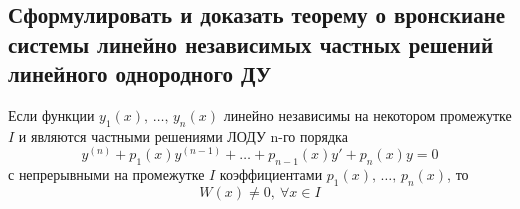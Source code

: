 \subsection{Сформулировать и доказать теорему о вронскиане системы линейно независимых частных решений линейного однородного ДУ}

\begin{theorem*}
    Если функции $y_1(x),\, \ldots,\, y_n(x)$ линейно независимы  на некотором промежутке $I$ и являются частными решениями ЛОДУ n-го порядка
    \[
        y^{(n)} + p_1(x)y^{(n-1)} + \ldots + p_{n-1}(x) y' + p_n(x) y = 0
    \]
    с непрерывными на промежутке $I$ коэффициентами $p_1(x),\, \ldots,\, p_n(x)$, то 
    \[
        W(x) \ne 0,\ \forall x \in I
    \]
\end{theorem*}
